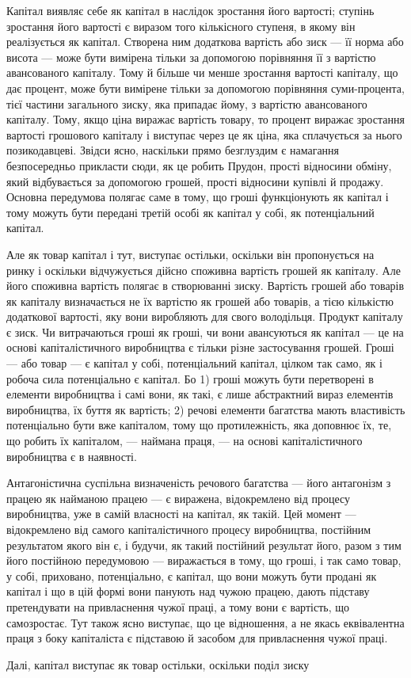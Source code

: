 Капітал виявляє себе як капітал в наслідок зростання його
вартості; ступінь зростання його вартості є виразом того кількісного
ступеня, в якому він реалізується як капітал. Створена
ним додаткова вартість або зиск — її норма або висота — може
бути вимірена тільки за допомогою порівняння її з вартістю
авансованого капіталу. Тому й більше чи менше зростання вартості
капіталу, що дає процент, може бути вимірене тільки
за допомогою порівняння суми-процента, тієї частини загального
зиску, яка припадає йому, з вартістю авансованого капіталу. Тому,
якщо ціна виражає вартість товару, то процент виражає зростання
вартості грошового капіталу і виступає через це як ціна,
яка сплачується за нього позикодавцеві. Звідси ясно, наскільки
прямо безглуздим є намагання безпосередньо прикласти сюди, як
це робить Прудон, прості відносини обміну, який відбувається за
допомогою грошей, прості відносини купівлі й продажу. Основна
передумова полягає саме в тому, що гроші функціонують як
капітал і тому можуть бути передані третій особі як капітал у
собі, як потенціальний капітал.

Але як товар капітал і тут, виступає остільки, оскільки він
пропонується на ринку і оскільки відчужується дійсно споживна
вартість грошей як капіталу. Але його споживна вартість полягає
в створюванні зиску. Вартість грошей або товарів як капіталу
визначається не їх вартістю як грошей або товарів, а тією
кількістю додаткової вартості, яку вони виробляють для свого
володільця. Продукт капіталу є зиск. Чи витрачаються гроші
як гроші, чи вони авансуються як капітал — це на основі капіталістичного
виробництва є тільки різне застосування грошей.
Гроші — або товар — є капітал у собі, потенціальний капітал, цілком
так само, як і робоча сила потенціально є капітал. Бо
1) гроші можуть бути перетворені в елементи виробництва і самі
вони, як такі, є лише абстрактний вираз елементів виробництва,
їх буття як вартість; 2) речові елементи багатства мають
властивість потенціально бути вже капіталом, тому що протилежність,
яка доповнює їх, те, що робить їх капіталом, — наймана
праця, — на основі капіталістичного виробництва є в наявності.

Антагоністична суспільна визначеність речового багатства —
його антагонізм з працею як найманою працею — є виражена,
відокремлено від процесу виробництва, уже в самій власності
на капітал, як такій. Цей момент — відокремлено від самого капіталістичного
процесу виробництва, постійним результатом якого
він є, і будучи, як такий постійний результат його, разом з тим
його постійною передумовою — виражається в тому, що гроші,
і так само товар, у собі, приховано, потенціально, є капітал, що
вони можуть бути продані як капітал і що в цій формі вони панують
над чужою працею, дають підставу претендувати на привласнення
чужої праці, а тому вони є вартість, що самозростає.
Тут також ясно виступає, що це відношення, а не якась еквівалентна
праця з боку капіталіста є підставою й засобом для привласнення
чужої праці.

Далі, капітал виступає як товар остільки, оскільки поділ зиску
\parbreak{}  %

